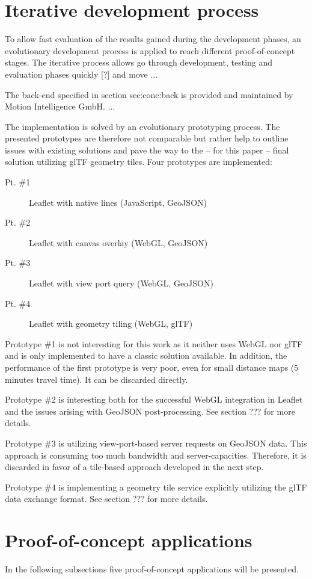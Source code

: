   \section{Iterative development process}
    To allow fast evaluation of the results gained during the development phases, an evolutionary development process is applied to reach different proof-of-concept stages. The iterative process allows go through development, testing and evaluation phases quickly [?] and move ...\par
    The back-end specified in section {sec:conc:back} is provided and maintained by Motion Intelligence GmbH. ...\par
    The implementation is solved by an evolutionary prototyping process. The presented prototypes are therefore not comparable but rather help to outline issues with existing solutions and pave the way to the -- for this paper -- final solution utilizing glTF geometry tiles. Four prototypes are implemented:
    \begin{description}
      \item[Pt. \#1] Leaflet with native lines (JavaScript, GeoJSON)
      \item[Pt. \#2] Leaflet with canvas overlay (WebGL, GeoJSON)
      \item[Pt. \#3] Leaflet with view port query (WebGL, GeoJSON)
      \item[Pt. \#4] Leaflet with geometry tiling (WebGL, glTF)
    \end{description}
    Prototype \#1 is not interesting for this work as it neither uses WebGL nor glTF and is only implemented to have a classic solution available. In addition, the performance of the first prototype is very poor, even for small distance maps (5 minutes travel time). It can be discarded directly.\par
    Prototype \#2 is interesting both for the successful WebGL integration in Leaflet and the issues arising with GeoJSON post-processing. See section ??? for more details.\par
    Prototype \#3 is utilizing view-port-based server requests on GeoJSON data. This approach is consuming too much bandwidth and server-capacities. Therefore, it is discarded in favor of a tile-based approach developed in the next step.\par
    Prototype \#4 is implementing a geometry tile service explicitly utilizing the glTF data exchange format. See section ??? for more details.
  \section{Proof-of-concept applications}
    In the following subsections five proof-of-concept applications will be presented.\par
